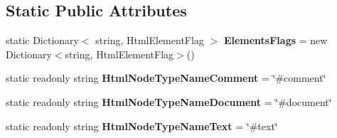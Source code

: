 \subsection*{Static Public Attributes}
\begin{DoxyCompactItemize}
\item 
\mbox{\label{class_html_agility_pack_1_1_html_node_af13756973e13f0e57e468b2aa4f0d279}} 
static Dictionary$<$ string, Html\+Element\+Flag $>$ {\bfseries Elements\+Flags} = new Dictionary$<$string, Html\+Element\+Flag$>$()
\item 
\mbox{\label{class_html_agility_pack_1_1_html_node_a4fcdace39efc99e574203a53331c73ca}} 
static readonly string {\bfseries Html\+Node\+Type\+Name\+Comment} = \char`\"{}\#comment\char`\"{}
\item 
\mbox{\label{class_html_agility_pack_1_1_html_node_a57a4fb1dc2f4bdfc627ef0899f65d203}} 
static readonly string {\bfseries Html\+Node\+Type\+Name\+Document} = \char`\"{}\#document\char`\"{}
\item 
\mbox{\label{class_html_agility_pack_1_1_html_node_aa3594faf0c6d5483bdaae5428d52a0c9}} 
static readonly string {\bfseries Html\+Node\+Type\+Name\+Text} = \char`\"{}\#text\char`\"{}
\end{DoxyCompactItemize}
